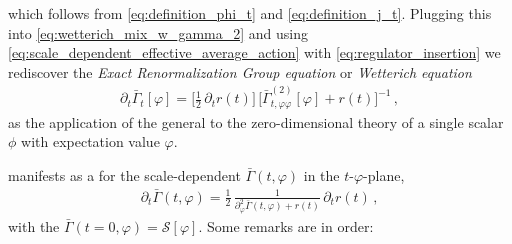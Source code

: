 which follows from \cref{eq:definition_phi_t} and \eqref{eq:definition_j_t}.
Plugging this into \cref{eq:wetterich_mix_w_gamma_2} and using \cref{eq:scale_dependent_effective_average_action} with \cref{eq:regulator_insertion} we rediscover the \textit{Exact Renormalization Group equation} or \textit{Wetterich equation}~\cite{Wetterich:1992yh,Ellwanger:1993mw,Morris:1993qb}
\begin{align}
	\partial_t \bar{\Gamma}_t [\varphi] = \big[\tfrac{1}{2} \, \partial_t r ( t ) \big] \, \big[ \bar{\Gamma}^{(2)}_{t , \varphi \varphi} [\varphi] + r ( t ) \big]^{-1} \, ,	\label{eq:WetterichEq0d}
\end{align}
as the application of the general \frgEq{} to the zero-dimensional theory of a single scalar $\phi$ with expectation value $\varphi$.
	
 manifests as a \pde{} for the scale-dependent \eaa{} $\bar{\Gamma} ( t, \varphi )$ in the $t$-$\varphi$-plane,
\begin{align}
	\partial_t \bar{\Gamma}(t,\varphi) = \frac{1}{2} \,\frac{1}{\partial_\varphi^2 \bar{\Gamma}(t,\varphi) + r ( t )}\,\partial_t r ( t ) \, ,	\label{eq:pde_gamma}
\end{align}
with the \ic{} $\bar{\Gamma} ( t = 0, \varphi ) = \mathcal{S} [ \varphi ]$.
Some remarks are in order:
